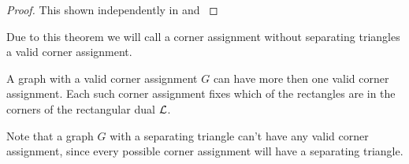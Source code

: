   \begin{proof}
    This shown independently in \cite{Kozminski1984} and  \cite{Ungar1953}
  \end{proof}

  Due to this theorem we will call a corner assignment without separating triangles a valid corner assignment.

  A graph with a valid corner assignment $G$ can have more then one valid corner assignment. Each such corner assignment fixes which of the rectangles are in the corners of the rectangular dual $\mathcal{L}$.

  Note that a graph $G$ with a separating triangle can't have any valid corner assignment, since every possible corner assignment will have a separating triangle.
